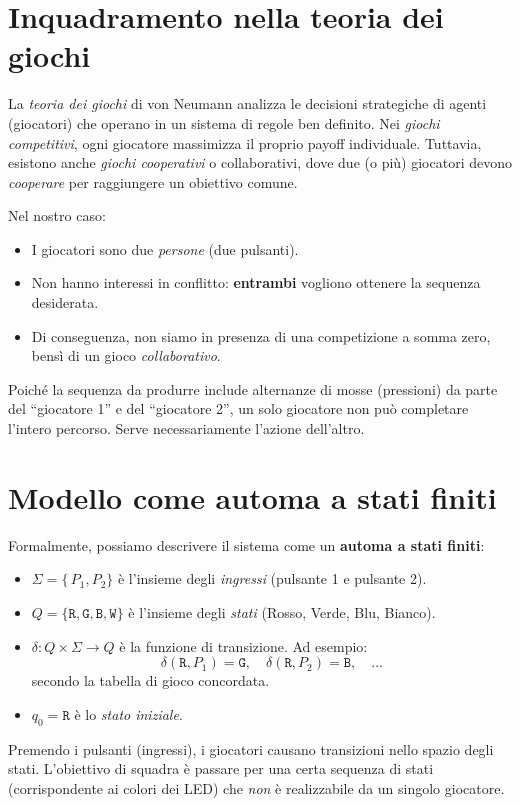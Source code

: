 \documentclass[a4paper,12pt]{report}
\begin{document}
\section{Inquadramento nella teoria dei giochi}
La \emph{teoria dei giochi} di von Neumann analizza le decisioni strategiche di agenti (giocatori) che operano in un sistema di regole ben definito. Nei \emph{giochi competitivi}, ogni giocatore massimizza il proprio payoff individuale. Tuttavia, esistono anche \emph{giochi cooperativi} o collaborativi, dove due (o più) giocatori devono \emph{cooperare} per raggiungere un obiettivo comune.

Nel nostro caso:
\begin{itemize}
    \item I giocatori sono due \emph{persone} (due pulsanti).
    \item Non hanno interessi in conflitto: \textbf{entrambi} vogliono ottenere la sequenza desiderata.
    \item Di conseguenza, non siamo in presenza di una competizione a somma zero, bensì di un gioco \emph{collaborativo}.
\end{itemize}
Poiché la sequenza da produrre include alternanze di mosse (pressioni) da parte del ``giocatore 1'' e del ``giocatore 2'', un solo giocatore non può completare l’intero percorso. Serve necessariamente l’azione dell’altro.

\section{Modello come automa a stati finiti}
Formalmente, possiamo descrivere il sistema come un \textbf{automa a stati finiti}:
\begin{itemize}
    \item \(\Sigma = \{\, P_1, P_2\}\) è l'insieme degli \emph{ingressi} (pulsante 1 e pulsante 2).
    \item \(Q = \{\texttt{R}, \texttt{G}, \texttt{B}, \texttt{W}\}\) è l'insieme degli \emph{stati} (Rosso, Verde, Blu, Bianco).
    \item \(\delta\colon Q\times \Sigma \to Q\) è la funzione di transizione. Ad esempio:
      \[
        \delta(\texttt{R}, P_1) = \texttt{G}, \quad
        \delta(\texttt{R}, P_2) = \texttt{B},\quad \dots
      \]
      secondo la tabella di gioco concordata.
    \item \(q_0 = \texttt{R}\) è lo \emph{stato iniziale}.
\end{itemize}
Premendo i pulsanti (ingressi), i giocatori causano transizioni nello spazio degli stati. L’obiettivo di squadra è passare per una certa sequenza di stati (corrispondente ai colori dei LED) che \emph{non} è realizzabile da un singolo giocatore.
\end{document}
